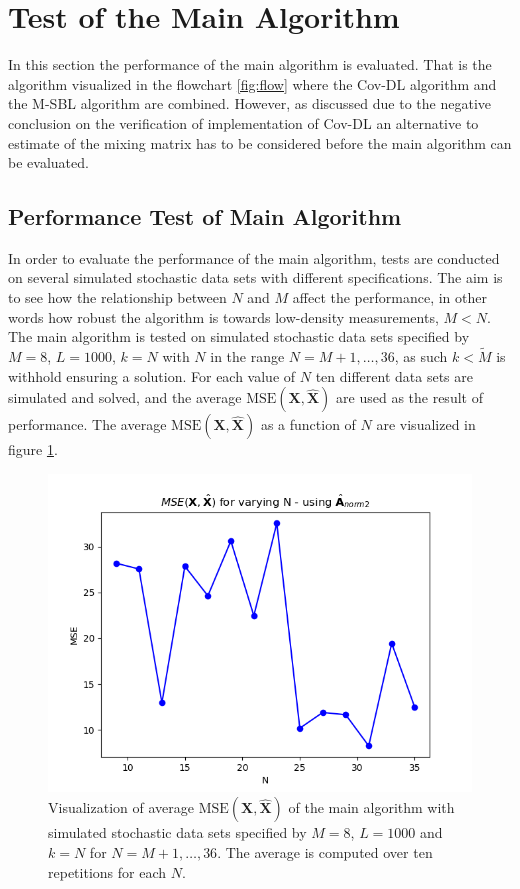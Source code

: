 \section{Test of the Main Algorithm}\label{sec:test_base}
In this section the performance of the main algorithm is evaluated. 
That is the algorithm visualized in the flowchart \ref{fig:flow} where the Cov-DL algorithm and the M-SBL algorithm are combined. 
However, as discussed due to the negative conclusion on the verification of implementation of Cov-DL an alternative to estimate of the mixing matrix has to be considered before the main algorithm can be evaluated.  
 
  

\subsection{Performance Test of Main Algorithm}\label{sec:Main_test}
In order to evaluate the performance of the main algorithm, tests are conducted on several simulated stochastic data sets with different specifications. 
The aim is to see how the relationship between $N$ and $M$ affect the performance, in other words how robust the algorithm is towards low-density measurements, $M < N$. 
The main algorithm is tested on simulated stochastic data sets specified by $M = 8$, $L = 1000$, $k = N$ with $N$ in the range $N = M+1, \dots, 36$, as such $k < \widetilde{M}$ is withhold ensuring a solution.
For each value of $N$ ten different data sets are simulated and solved, and the average $\text{MSE}(\mathbf{X}, \hat{\mathbf{X}})$ are used as the result of performance. 
The average $\text{MSE}(\mathbf{X}, \hat{\mathbf{X}})$ as a function of $N$ are visualized in figure \ref{fig:varyN1}.
\begin{figure}[H]
    \centering
	\includegraphics[scale=0.5]{figures/ch_6/varyN1.png}
	\caption{Visualization of average $\text{MSE}(\mathbf{X}, \hat{\mathbf{X}})$ of the main algorithm with simulated stochastic data sets specified by $M = 8$, $L = 1000$ and $k = N$ for $N = M+1, \dots , 36$. The average is computed over ten repetitions for each $N$.}
	\label{fig:varyN1}
\end{figure}
